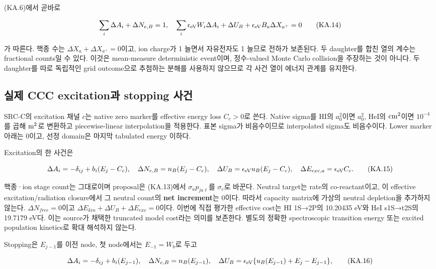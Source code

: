 (KA.6)에서 곧바로

\[
 \sum_i\Delta A_i+\Delta N_{e,B}=1,
\quad
 \sum_i\epsilon_{\rm eV}W_i\Delta A_i+\Delta U_B+\epsilon_{\rm eV}B_a\Delta X_{a^+}=0
 \tag{KA.14}
\]

가 따른다. 핵종 수는 \(\Delta X_a+\Delta X_{a^+}=0\)이고, ion charge가 1 늘면서 자유전자도 1 늘므로 전하가 보존된다. 두 daughter를 합친 열의 계수는 fractional counts일 수 있다. 이것은 mean-measure deterministic event이며, 정수-valued Monte Carlo collision을 주장하는 것이 아니다. 두 daughter를 따로 독립적인 grid outcome으로 추첨하는 분해를 사용하지 않으므로 각 사건 열이 에너지 관계를 유지한다.

\hypertarget{uxc2e4uxc81c-ccc-excitationuxacfc-stopping-uxc0acuxac74}{%
\subsection{실제 CCC excitation과 stopping 사건}\label{uxc2e4uxc81c-ccc-excitationuxacfc-stopping-uxc0acuxac74}}

SRC-C의 excitation 채널 \(c\)는 native zero marker를 effective energy loss \(C_c>0\)로 쓴다. Native sigma를 HI의 \(a_0^2\)이면 \(a_0^2\), HeI의 \({\rm cm}^2\)이면 \(10^{-4}\)를 곱해 \({\rm m}^2\)로 변환하고 piecewise-linear interpolation을 적용한다. 표본 sigma가 비음수이므로 interpolated sigma도 비음수이다. Lower marker 아래는 0이고, 선정 domain은 마지막 tabulated energy 이하다.

Excitation의 한 사건은

\[
 \Delta A_i=-\delta_{ij}+b_i(E_j-C_c),\quad
 \Delta N_{e,B}=n_B(E_j-C_c),\quad
 \Delta U_B=\epsilon_{\rm eV}u_B(E_j-C_c),\quad
 \Delta E_{exc,a}=\epsilon_{\rm eV}C_c.
 \tag{KA.15}
\]

핵종·ion stage count는 그대로이며 proposal은 (KA.13)에서 \(\sigma_ap_{ja\ell}\)를 \(\sigma_c\)로 바꾼다. Neutral target는 rate의 co-reactant이고, 이 effective excitation/radiation closure에서 그 neutral count의 \textbf{net increment}는 0이다. 따라서 capacity matrix에 가상의 neutral depletion을 추가하지 않는다. \(\Delta N_{free}=0\)이고 \(\Delta E_{kin}+\Delta U_B+\Delta E_{exc}=0\)이다. 이번에 직접 평가한 effective cost는 HI 1S→2P의 10.20435 eV와 HeI s1S→t2S의 19.7179 eV다. 이는 source가 채택한 truncated model cost라는 의미를 보존한다. 별도의 정확한 spectroscopic transition energy 또는 excited population kinetics로 확대 해석하지 않는다.

Stopping은 \(E_{j-1}\)를 이전 node, 첫 node에서는 \(E_{-1}=W_b\)로 두고

\[
 \Delta A_i=-\delta_{ij}+b_i(E_{j-1}),\quad
 \Delta N_{e,B}=n_B(E_{j-1}),\quad
 \Delta U_B=\epsilon_{\rm eV}\{u_B(E_{j-1})+E_j-E_{j-1}\},
 \tag{KA.16}
\]

